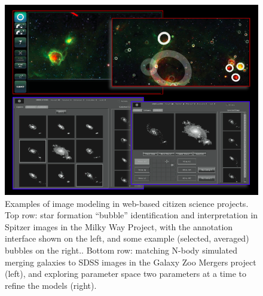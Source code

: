 \documentclass{ar2e}
\begin{document}
\begin{figure}[!ht]
\centering\includegraphics[width=\linewidth]{figs/modeling.png}
\caption{Examples of image modeling in web-based citizen science projects. Top
row: star formation ``bubble'' identification and interpretation in Spitzer
images in the Milky Way Project, with the annotation interface shown on the
left, and some example (selected, averaged) bubbles on the right.. 
Bottom row: matching N-body simulated merging
galaxies to SDSS images in the Galaxy Zoo Mergers project (left), and
exploring parameter space two parameters at a time to refine the models
(right).}
\label{fig:modeling}
\end{figure}

\end{document}
